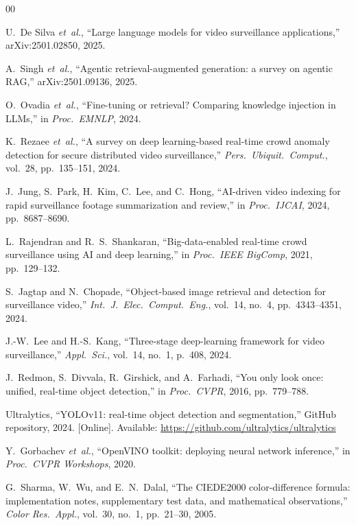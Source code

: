 ﻿\documentclass[conference]{IEEEtran}
\theoremstyle{definition}
\begin{document}
\begin{thebibliography}{00}

 U.~De Silva \emph{et~al.}, ``Large language models for video surveillance applications,'' arXiv:2501.02850, 2025.

 A.~Singh \emph{et~al.}, ``Agentic retrieval-augmented generation: a survey on agentic RAG,'' arXiv:2501.09136, 2025.

 O.~Ovadia \emph{et~al.}, ``Fine-tuning or retrieval? Comparing knowledge injection in LLMs,'' in \emph{Proc.\ EMNLP}, 2024.

 K.~Rezaee \emph{et~al.}, ``A survey on deep learning-based real-time crowd anomaly detection for secure distributed video surveillance,'' \emph{Pers.\ Ubiquit.\ Comput.}, vol.~28, pp.~135--151, 2024.

 J.~Jung, S.~Park, H.~Kim, C.~Lee, and C.~Hong, ``AI-driven video indexing for rapid surveillance footage summarization and review,'' in \emph{Proc.\ IJCAI}, 2024, pp.~8687--8690.

 L.~Rajendran and R.~S.~Shankaran, ``Big-data-enabled real-time crowd surveillance using AI and deep learning,'' in \emph{Proc.\ IEEE BigComp}, 2021, pp.~129--132.

 S.~Jagtap and N.~Chopade, ``Object-based image retrieval and detection for surveillance video,'' \emph{Int.\ J.\ Elec.\ Comput.\ Eng.}, vol.~14, no.~4, pp.~4343--4351, 2024.

 J.-W.~Lee and H.-S.~Kang, ``Three-stage deep-learning framework for video surveillance,'' \emph{Appl.\ Sci.}, vol.~14, no.~1, p.~408, 2024.

 J.~Redmon, S.~Divvala, R.~Girshick, and A.~Farhadi, ``You only look once: unified, real-time object detection,'' in \emph{Proc.\ CVPR}, 2016, pp.~779--788.

 Ultralytics, ``YOLOv11: real-time object detection and segmentation,'' GitHub repository, 2024. [Online]. Available: \url{https://github.com/ultralytics/ultralytics}

 Y.~Gorbachev \emph{et~al.}, ``OpenVINO toolkit: deploying neural network inference,'' in \emph{Proc.\ CVPR Workshops}, 2020.

 G.~Sharma, W.~Wu, and E.~N.~Dalal, ``The CIEDE2000 color-difference formula: implementation notes, supplementary test data, and mathematical observations,'' \emph{Color Res.\ Appl.}, vol.~30, no.~1, pp.~21--30, 2005.


\end{thebibliography}
\end{document}
